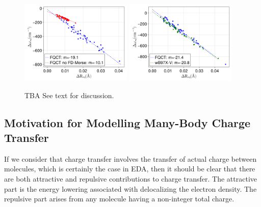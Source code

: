 \documentclass[journal=jctcce,manuscript=article]{achemso}
\begin{document}
\begin{figure}[H]
   \includegraphics*[width=0.475\textwidth]{figures/badger_correlation_no_fd_morse.png}
     \includegraphics*[width=0.475\textwidth]{figures/badger_correlation_final.png}
  \caption{TBA See text for discussion.}
  \label{fig:badger}
\end{figure}

\subsection*{Motivation for Modelling Many-Body Charge Transfer}
If we consider that charge transfer involves the transfer of actual charge between
molecules, which is certainly the case in EDA\cite{thirman2018characterizing},
then it should be clear that there are both attractive and repulsive contributions
to charge transfer. The attractive part is the energy lowering associated with delocalizing
the electron density. The repulsive part arises from any molecule having a non-integer
total charge.
\end{document}
